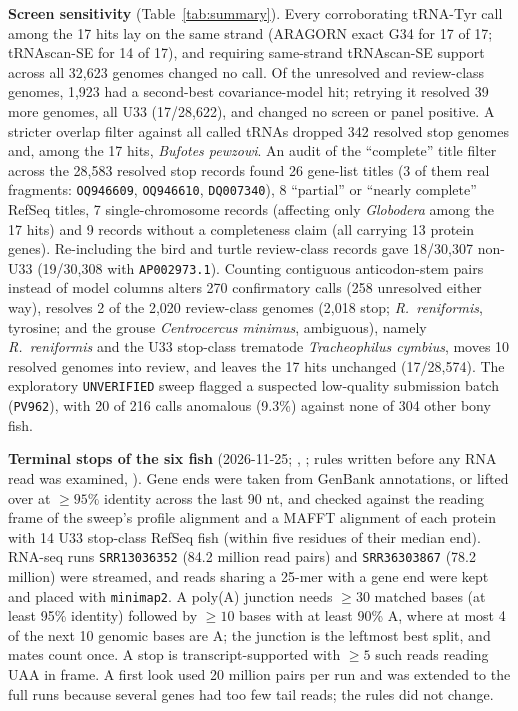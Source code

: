 \documentclass[11pt, a4paper]{article}
\begin{document}
\textbf{Screen sensitivity} (Table~\ref{tab:summary}). Every corroborating tRNA-Tyr call among the 17 hits lay on the same strand (ARAGORN exact G34 for 17 of 17; tRNAscan-SE for 14 of 17), and requiring same-strand tRNAscan-SE support across all 32,623 genomes changed no call. Of the unresolved and review-class genomes, 1,923 had a second-best covariance-model hit; retrying it resolved 39 more genomes, all U33 (17/28,622), and changed no screen or panel positive. A stricter overlap filter against all called tRNAs dropped 342 resolved stop genomes and, among the 17 hits, \textit{Bufotes pewzowi}. An audit of the ``complete'' title filter across the 28,583 resolved stop records found 26 gene-list titles (3 of them real fragments: \texttt{OQ946609}, \texttt{OQ946610}, \texttt{DQ007340}), 8 ``partial'' or ``nearly complete'' RefSeq titles, 7 single-chromosome records (affecting only \textit{Globodera} among the 17 hits) and 9 records without a completeness claim (all carrying 13 protein genes). Re-including the bird and turtle review-class records gave 18/30,307 non-U33 (19/30,308 with \texttt{AP002973.1}). Counting contiguous anticodon-stem pairs instead of model columns alters 270 confirmatory calls (258 unresolved either way), resolves 2 of the 2,020 review-class genomes (2,018 stop; \textit{R.\ reniformis}, tyrosine; and the grouse \textit{Centrocercus minimus}, ambiguous), namely \textit{R.\ reniformis} and the U33 stop-class trematode \textit{Tracheophilus cymbius}, moves 10 resolved genomes into review, and leaves the 17 hits unchanged (17/28,574). The exploratory \texttt{UNVERIFIED} sweep flagged a suspected low-quality submission batch (\texttt{PV962}), with 20 of 216 calls anomalous (9.3\%) against none of 304 other bony fish.

\textbf{Terminal stops of the six fish} (2026-11-25; , ; rules written before any RNA read was examined, ). Gene ends were taken from GenBank annotations, or lifted over at $\ge 95\%$ identity across the last 90 nt, and checked against the reading frame of the sweep's profile alignment and a MAFFT alignment of each protein with 14 U33 stop-class RefSeq fish (within five residues of their median end). RNA-seq runs \texttt{SRR13036352} (84.2 million read pairs) and \texttt{SRR36303867} (78.2 million) were streamed, and reads sharing a 25-mer with a gene end were kept and placed with \texttt{minimap2}. A poly(A) junction needs $\ge 30$ matched bases (at least 95\% identity) followed by $\ge 10$ bases with at least 90\% A, where at most 4 of the next 10 genomic bases are A; the junction is the leftmost best split, and mates count once. A stop is transcript-supported with $\ge 5$ such reads reading UAA in frame. A first look used 20 million pairs per run and was extended to the full runs because several genes had too few tail reads; the rules did not change.
\end{document}

